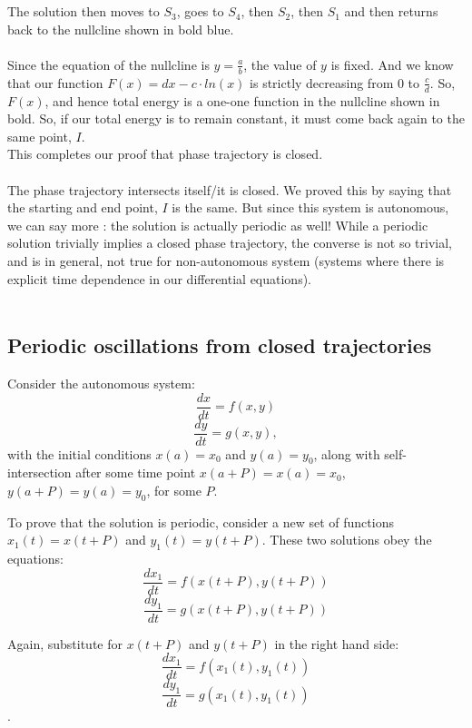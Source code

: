 \documentclass{article}
\begin{document}
\\
\\
The solution then moves to $S_3$, goes to $S_4$, then $S_2$, then $S_1$ and then returns back to the nullcline shown in bold blue. 
\\
\\
Since the equation of the nullcline is $y = \frac{a}{b}$, the value of $y$ is fixed. And we know that our function $F(x) = dx - c\cdot ln(x)$ is strictly decreasing from 0 to $\frac{c}{d}$. So, $F(x)$, and hence total energy is a one-one function in the nullcline shown in bold. So, if our total energy is to remain constant, it must come back again to the same point, $I$. 
\\This completes our proof that phase trajectory is closed.
\\
\\
The phase trajectory intersects itself/it is closed. We proved this by saying that the starting and end point, $I$ is the same. But since this system is autonomous, we can say more : the solution is actually periodic as well! While a periodic solution trivially implies a closed phase trajectory, the converse is not so trivial, and is in general, not true for non-autonomous system (systems where there is explicit time dependence in our differential equations).
\\
\\


\subsection{Periodic oscillations from closed trajectories}

Consider the autonomous system:
$$\frac{dx}{dt} = f(x, y)$$
$$\frac{dy}{dt} = g(x, y),$$
with the initial conditions $x(a) = x_0$ and $y(a) = y_0$, along with self-intersection after some time point $x(a + P) = x(a) = x_0$, $y(a + P) = y(a) = y_0$, for some $P$.

To prove that the solution is periodic, consider a new set of functions $x_1(t) = x(t + P)$ and $y_1(t) = y(t + P)$. These two solutions obey the equations:
$$\frac{dx_1}{dt} = f(x(t + P), y(t + P))$$
$$\frac{dy_1}{dt} = g(x(t+P), y(t+P))$$

Again, substitute for $x(t + P)$ and $y(t + P)$ in the right hand side:
$$\frac{dx_1}{dt} = f(x_1(t), y_1(t))$$
$$\frac{dy_1}{dt} = g(x_1(t), y_1(t))$$.
\end{document}

